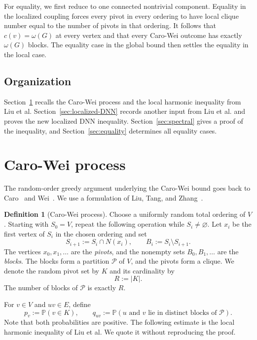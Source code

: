 \documentclass[11pt]{article}
\numberwithin{equation}{section}
\theoremstyle{definition}
\newtheorem{definition}[theorem]{Definition}
\theoremstyle{remark}
\newcommand{\Prob}{\mathbb P}
\begin{document}
	For equality, we first reduce to one connected nontrivial component.
	Equality in the localized coupling forces every pivot in every ordering
	to have local clique number equal to the number of pivots in that
	ordering.  It follows that $c(v)=\omega(G)$ at every vertex and that
	every Caro-Wei outcome has exactly $\omega(G)$ blocks. The equality case in the global bound then settles the equality in the local case.
	
	
	\subsection*{Organization}
	Section~\ref{sec:inputs} recalls the Caro-Wei process and the local harmonic inequality from Liu et al.
	Section~\ref{sec:localized-DNN} records another input from Liu et al. and proves the new localized DNN inequality.
	Section~\ref{sec:spectral} gives a proof of the inequality, and
	Section~\ref{sec:equality} determines all equality cases.
	
	\section{  Caro-Wei process}\label{sec:inputs}
	
	The random-order greedy argument underlying the Caro-Wei bound goes back
	to Caro~\cite{caro1979new} and Wei~\cite{wei1981lower}.  We use a formulation of Liu, Tang, and
	Zhang~\cite[Definition~1.5]{liu2026positive}.
	
	\begin{definition}[Caro-Wei process]\label{def:CW}
		Choose a uniformly random total ordering of $V$.  Starting with
		$S_0=V$, repeat the following operation while $S_i\neq\varnothing$.
		Let $x_i$ be the first vertex of $S_i$ in the chosen ordering and set
		\[
		S_{i+1}:=S_i\cap N(x_i),
		\qquad
		B_i:=S_i\setminus S_{i+1}.
		\]
		The vertices $x_0,x_1,\ldots$ are the \emph{pivots}, and the nonempty
		sets $B_0,B_1,\ldots$ are the \emph{blocks}.  The blocks form a partition
		$\mathcal P$ of $V$, and the pivots form a clique.  We denote the
		random pivot set by $K$ and its cardinality by
		\[
		R:=|K|.
		\]
		The number of blocks of $\mathcal P$ is exactly $R$.
	\end{definition}
	
	For $v\in V$ and $uv\in E$, define
	\[
	p_v:=\Prob(v\in K),
	\qquad
	q_{uv}:=\Prob(u\text{ and }v\text{ lie in distinct blocks of }\mathcal P).
	\]
	Note that both probabilities are positive.  The following estimate is the local
	harmonic inequality of Liu et al.  We quote it without
	reproducing the proof.
	
\end{document}
